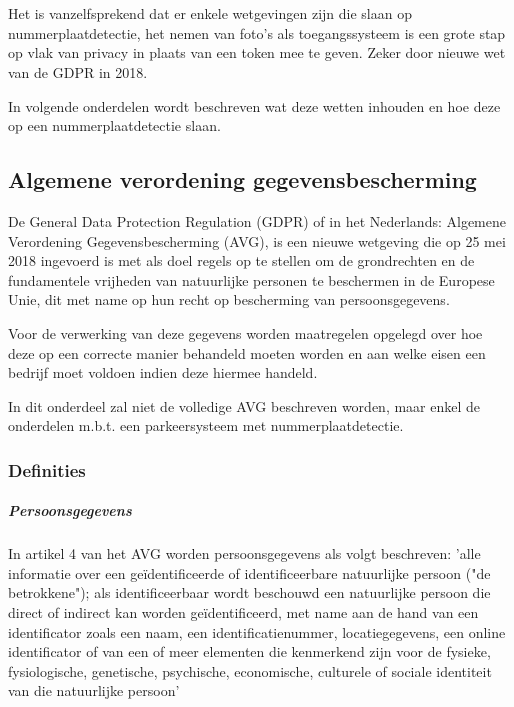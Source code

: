 
\chapter{}
\label{ch:wetgeving-nummerplaatdetectie}

Het is vanzelfsprekend dat er enkele wetgevingen zijn die slaan op nummerplaatdetectie, het nemen van foto's als toegangssysteem is een grote stap op vlak van privacy in plaats van een token mee te geven. Zeker door nieuwe wet van de GDPR in 2018.

In volgende onderdelen wordt beschreven wat deze wetten inhouden en hoe deze op een nummerplaatdetectie slaan.

\section{Algemene verordening gegevensbescherming}
De General Data Protection Regulation (GDPR) of in het Nederlands: Algemene Verordening Gegevensbescherming (AVG), is een nieuwe wetgeving die op 25 mei 2018 ingevoerd is met als doel regels op te stellen om de grondrechten en de fundamentele vrijheden van natuurlijke personen te beschermen in de Europese Unie, dit met name op hun recht op bescherming van persoonsgegevens. \autocite{avg2018privacy}

Voor de verwerking van deze gegevens worden maatregelen opgelegd over hoe deze op een correcte manier behandeld moeten worden en aan welke eisen een bedrijf moet voldoen indien deze hiermee handeld.

In dit onderdeel zal niet de volledige AVG beschreven worden, maar enkel de onderdelen m.b.t. een parkeersysteem met nummerplaatdetectie.

\subsection{Definities}

\paragraph{Persoonsgegevens}
In artikel 4 van het AVG worden persoonsgegevens als volgt beschreven: 'alle informatie over een geïdentificeerde of identificeerbare natuurlijke persoon ("de betrokkene"); als identificeerbaar wordt beschouwd een natuurlijke persoon die direct of indirect kan worden geïdentificeerd, met name aan de hand van een identificator zoals een naam, een identificatienummer, locatiegegevens, een online identificator of van een of meer elementen die kenmerkend zijn voor de fysieke, fysiologische, genetische, psychische, economische, culturele of sociale identiteit van die natuurlijke persoon' \autocite{avg2018privacy}

